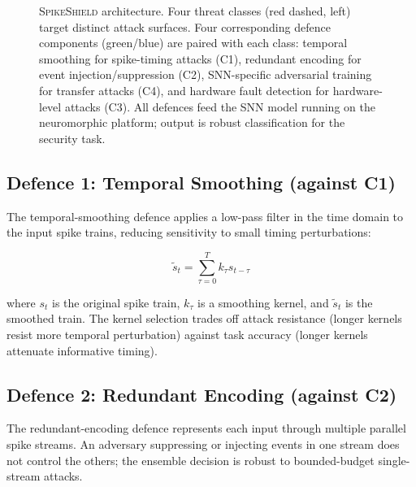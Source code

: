 \documentclass[sigconf,nonacm]{acmart}
\begin{document}
\begin{figure}[t]
\caption{\textsc{SpikeShield} architecture. Four threat classes
  (red dashed, left) target distinct attack surfaces. Four
  corresponding defence components (green/blue) are paired with
  each class: temporal smoothing for spike-timing attacks (C1),
  redundant encoding for event injection/suppression (C2),
  SNN-specific adversarial training for transfer attacks (C4),
  and hardware fault detection for hardware-level attacks (C3).
  All defences feed the SNN model running on the neuromorphic
  platform; output is robust classification for the security
  task.}
\label{fig:framework}
\end{figure}

\subsection{Defence 1: Temporal Smoothing (against C1)}

The temporal-smoothing defence applies a low-pass filter in the
time domain to the input spike trains, reducing sensitivity to
small timing perturbations:

\begin{equation}
  \tilde{s}_t = \sum_{\tau=0}^{T} k_\tau s_{t-\tau}
\end{equation}

where $s_t$ is the original spike train, $k_\tau$ is a smoothing
kernel, and $\tilde{s}_t$ is the smoothed train. The kernel
selection trades off attack resistance (longer kernels resist more
temporal perturbation) against task accuracy (longer kernels
attenuate informative timing).

\subsection{Defence 2: Redundant Encoding (against C2)}

The redundant-encoding defence represents each input through
multiple parallel spike streams. An adversary suppressing or
injecting events in one stream does not control the others; the
ensemble decision is robust to bounded-budget single-stream
attacks.
\end{document}
